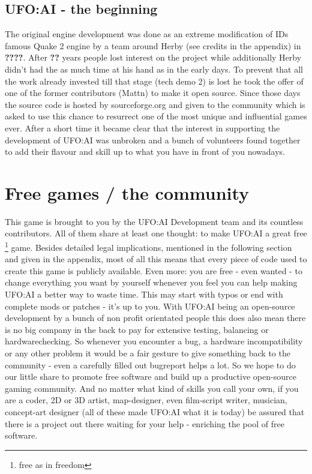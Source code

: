 

\subsection{UFO:AI - the beginning}
The original engine development was done as an extreme modification of IDs famous Quake 2 engine by a team around Herby (see credits in the appendix) in \textbf{????}. After \textbf{??} years people lost interest on the project while additionally Herby didn't had the as much time at his hand as in the early days.
To prevent that all the work already invested till that stage (tech demo 2) is lost he took the offer of one of the former contributors (Mattn) to make it open source.  Since those days the source code is hosted by sourceforge.org and given to the community which is asked to use this chance to resurrect one of the most unique and influential games ever. After a short time it became clear that the interest in supporting the development of UFO:AI was unbroken and a bunch of volunteers found together to add their flavour and skill up to what you have in front of you nowadays.

\section{Free games / the community}
This game is brought to you by the UFO:AI Development team and its countless contributors. All of them share at least one thought: to make UFO:AI a great free \footnote{free as in freedom}
 game. Besides detailed legal implications, mentioned in the following section and given in the appendix, most of all this means that every piece of code used to create this game is publicly available. Even more: you are free - even wanted - to change everything you want by yourself whenever you feel you can help making UFO:AI a better way to waste time. This may start with typos or end with complete mods or patches - it's up to you. With UFO:AI being an open-source development by a bunch of non profit orientated people this does also mean there is no big company in the back to pay for extensive testing, balancing or hardwarechecking. So whenever you encounter a bug, a hardware incompatibility or any other problem it would be a fair gesture to give something back to the community - even a carefully filled out bugreport helps a lot. So we hope to do our little share to promote free software and build up a productive open-source gaming community. And no matter what kind of skills you call your own, if you are a coder, 2D or 3D artist, map-designer, even film-script writer, musician, concept-art designer (all of these made UFO:AI what it is today) be assured that there is a project out there waiting for your help - enriching the pool of free software.


